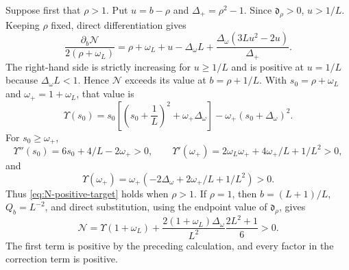 \documentclass[a4paper,preprint,12pt,nopreprintline,sort&compress]{elsarticle}
\numberwithin{equation}{section}
\theoremstyle{remark}
\begin{document}
Suppose first that \(\rho>1\).  Put \(u=b-\rho\) and
\(\Delta_+=\rho^2-1\).  Since \(\mathfrak d_\rho>0\), \(u>1/L\).
Keeping \(\rho\) fixed,
direct differentiation gives
\[
 \frac{\partial_b\mathcal N}{2(\rho+\omega_L)}
 =\rho+\omega_L+u-\Delta_\omega L
 +\frac{\Delta_\omega(3Lu^2-2u)}{\Delta_+}.
\]
The right-hand side is strictly increasing for \(u\geq1/L\) and is positive
at \(u=1/L\) because \(\Delta_\omega L<1\).  Hence \(\mathcal N\) exceeds
its value at
\(b=\rho+1/L\).  With
\(s_0=\rho+\omega_L\) and \(\omega_+=1+\omega_L\), that value is
\[
 \Upsilon(s_0)
 =s_0\left[\left(s_0+\frac1L\right)^2+\omega_+\Delta_\omega\right]
 -\omega_+(s_0+\Delta_\omega)^2.
\]
For \(s_0\geq\omega_+\),
\[
 \Upsilon''(s_0)=6s_0+4/L-2\omega_+>0,\qquad
 \Upsilon'(\omega_+)=2\omega_L\omega_++4\omega_+/L+1/L^2>0,
\]
and
\[
 \Upsilon(\omega_+)
 =\omega_+(-2\Delta_\omega+2\omega_+/L+1/L^2)>0.
\]
Thus \eqref{eq:N-positive-target} holds when \(\rho>1\).  If \(\rho=1\),
then \(b=(L+1)/L\), \(Q_b=L^{-2}\), and direct substitution, using the
endpoint value of \(\mathfrak d_\rho\), gives
\[
 \mathcal N=\Upsilon(1+\omega_L)
 +\frac{2(1+\omega_L)\Delta_\omega}{L^2}
   \frac{2L^2+1}{6}>0.
\]
The first term is positive by the preceding calculation, and every factor
in the correction term is positive.
\end{document}
